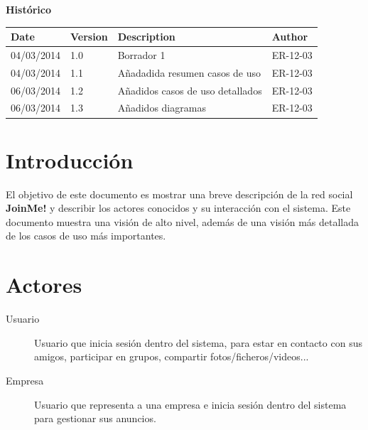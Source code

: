 \documentclass[12pt, a4paper, titlepage]{article}
\begin{document}
\begin{titlepage}
\vspace{2cm}
\begin{center}
	\large{\textbf{Histórico}}
	
    \begin{tabular}{ | p{4cm} | p{2cm} | p{5cm} | p{4cm} |}
    \hline
    \textbf{Date} & \textbf{Version} & \textbf{Description} & \textbf{Author} \\ \hline
    04/03/2014 & 1.0 & Borrador 1  & ER-12-03  \\ \hline
     04/03/2014 & 1.1 & Añadadida resumen casos de uso & ER-12-03  \\ \hline
     06/03/2014 & 1.2 & Añadidos casos de uso detallados & ER-12-03  \\ \hline
     06/03/2014 & 1.3 & Añadidos diagramas & ER-12-03  \\ \hline
    \end{tabular}
\end{center}

\end{titlepage}
\clearpage


\tableofcontents
\clearpage

\section{Introducción}

El objetivo de este documento es mostrar una breve descripción de la red social \textbf{JoinMe!} y describir los actores conocidos y su interacción con el sistema.
Este documento muestra una visión de alto nivel, además de una visión más detallada de los casos de uso más importantes.

\section{Actores}
\begin{description}

\item [Usuario] Usuario que inicia sesión dentro del sistema, para estar en contacto con sus amigos, participar en grupos, compartir fotos/ficheros/videos...

\item [Empresa] Usuario que representa a una empresa e inicia sesión dentro del sistema para gestionar sus anuncios.

\end{description}
\end{document}
